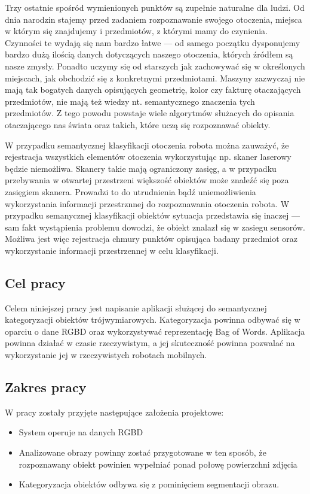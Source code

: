 \documentclass[a4paper,10pt]{article}
\begin{document}
  Trzy ostatnie spośród wymienionych punktów są zupełnie naturalne dla ludzi. Od dnia narodzin stajemy przed zadaniem rozpoznawanie swojego otoczenia, miejsca w którym się znajdujemy i przedmiotów, z którymi mamy do czynienia. Czynności te wydają się nam bardzo łatwe --- od samego początku dysponujemy bardzo dużą ilością danych dotyczących naszego otoczenia, których źródłem są nasze zmysły. Ponadto uczymy się od starszych jak zachowywać się w określonych miejscach, jak obchodzić się z konkretnymi przedmiotami. Maszyny zazwyczaj nie mają tak bogatych danych opisujących geometrię, kolor czy fakturę otaczających przedmiotów, nie mają też wiedzy nt. semantycznego znaczenia tych przedmiotów. Z tego powodu powstaje wiele algorytmów służacych do opisania otaczającego nas świata oraz takich, które uczą się rozpoznawać obiekty.
  
  W przypadku semantycznej klasyfikacji otoczenia robota można zauważyć, że rejestracja wszystkich elementów otoczenia wykorzystując np. skaner laserowy będzie niemożliwa. Skanery takie mają ograniczony zasięg, a w przypadku przebywania w otwartej przestrzeni większość obiektów może znaleźć się poza zasięgiem skanera. Prowadzi to do utrudnienia bądź uniemożliwienia wykorzystania informacji przestrznnej do rozpoznawania otoczenia robota. W przypadku semanycznej klasyfikacji obiektów sytuacja przedstawia się inaczej --- sam fakt wystąpienia problemu dowodzi, że obiekt znalazł się w zasiegu sensorów. Możliwa jest więc rejestracja chmury punktów opisująca badany przedmiot oraz wykorzystanie informacji przestrzennej w celu klasyfikacji.
  

\subsection{Cel pracy}

  Celem niniejszej pracy jest napisanie aplikacji służącej do semantycznej kategoryzacji obiektów trójwymiarowych. Kategoryzacja powinna odbywać się w oparciu o dane RGBD oraz wykorzystywać reprezentację Bag of Words. Aplikacja powinna działać w czasie rzeczywistym, a jej skuteczność powinna pozwalać na wykorzystanie jej w rzeczywistych robotach mobilnych.

\subsection{Zakres pracy}

  W pracy zostały przyjęte następujące założenia projektowe:
  \begin{itemize}
   \item System operuje na danych RGBD
   \item Analizowane obrazy powinny zostać przygotowane w ten sposób, że rozpoznawany obiekt powinien wypełniać ponad połowę powierzchni zdjęcia
   \item Kategoryzacja obiektów odbywa się z pominięciem segmentacji obrazu.
  \end{itemize}
  
\end{document}

